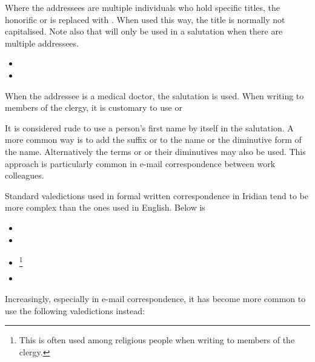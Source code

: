 Where the addressees are multiple individuals who hold specific titles, the honorific  or  is replaced with . When used this way, the title is normally not capitalised. Note also that  will only be used in a salutation when there are multiple addressees.

\begin{itemize}[nosep]
	\item {}
	\item {}
\end{itemize}

When the addressee is a medical doctor, the salutation  is used. When writing to members of the clergy, it is customary to use  or 

It is considered rude to use a person's first name by itself in the salutation. A more common way is to add the suffix  or  to the name or the diminutive form of the name. Alternatively the terms  or  or their diminutives may also be used. This approach is particularly common in e-mail correspondence between work colleagues.

Standard valedictions used in formal written correspondence in Iridian tend to be more complex than the ones used in English. Below is 

\begin{itemize}[nosep]
	\item {}
	\item {}
	\item {}\footnote{This is often used among religious people when writing to members of the clergy.}
	\item {}

\end{itemize}

Increasingly, especially in e-mail correspondence, it has become more common to use the following valedictions instead:

